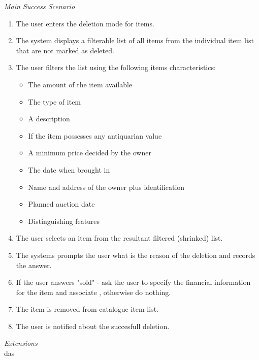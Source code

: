 \textsl{Main Success Scenario}
\begin{enumerate}[noitemsep]
	\item The user enters the deletion mode for items.
	\item The system displays a filterable list of all items from the individual item list that are not marked as deleted.
	\item The user filters the list using the following items characteristics:
	\begin{itemize}[noitemsep]
		\item The amount of the item available
		\item The type of item
		\item A description
		\item If the item possesses any antiquarian value
		\item A minimum price decided by the owner
		\item The date when brought in
		\item Name and address of the owner plus identification
		\item Planned auction date
		\item Distinguishing features
	\end{itemize}
	\item The user selects an item from the resultant filtered (shrinked) list.
	\item The systems prompts the user what is the reason of the deletion and records the answer.
	\item If the user answers "sold" - ask the user to specify the financial information for the item and associate , otherwise do nothing.
	\item The item is removed from catalogue item list.
	\item The user is notified about the succesfull deletion. 
\end{enumerate}
\textsl{Extensions}\\
\null\quad das
\\

